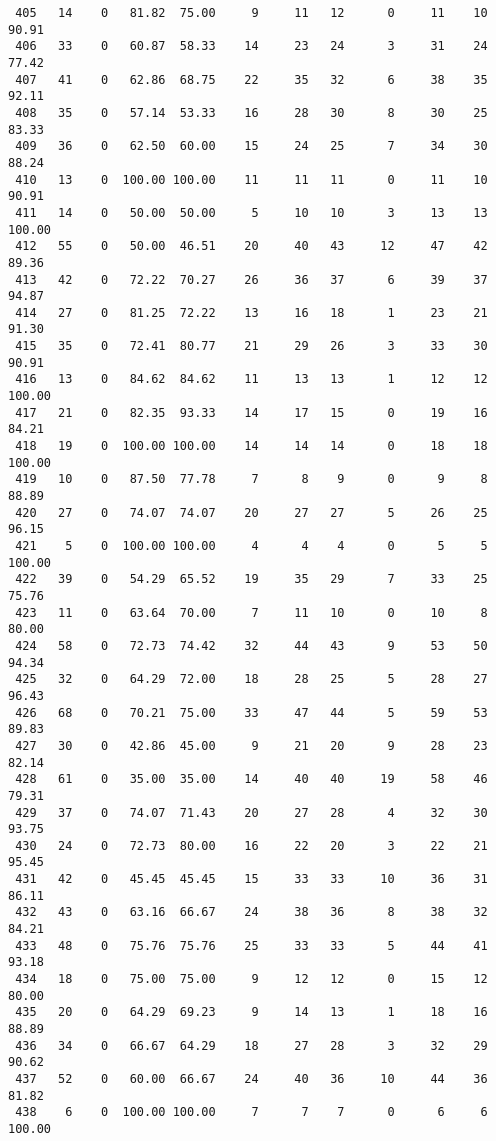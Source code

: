\begin{verbatim}
 405   14    0   81.82  75.00     9     11   12      0     11    10    90.91
 406   33    0   60.87  58.33    14     23   24      3     31    24    77.42
 407   41    0   62.86  68.75    22     35   32      6     38    35    92.11
 408   35    0   57.14  53.33    16     28   30      8     30    25    83.33
 409   36    0   62.50  60.00    15     24   25      7     34    30    88.24
 410   13    0  100.00 100.00    11     11   11      0     11    10    90.91
 411   14    0   50.00  50.00     5     10   10      3     13    13   100.00
 412   55    0   50.00  46.51    20     40   43     12     47    42    89.36
 413   42    0   72.22  70.27    26     36   37      6     39    37    94.87
 414   27    0   81.25  72.22    13     16   18      1     23    21    91.30
 415   35    0   72.41  80.77    21     29   26      3     33    30    90.91
 416   13    0   84.62  84.62    11     13   13      1     12    12   100.00
 417   21    0   82.35  93.33    14     17   15      0     19    16    84.21
 418   19    0  100.00 100.00    14     14   14      0     18    18   100.00
 419   10    0   87.50  77.78     7      8    9      0      9     8    88.89
 420   27    0   74.07  74.07    20     27   27      5     26    25    96.15
 421    5    0  100.00 100.00     4      4    4      0      5     5   100.00
 422   39    0   54.29  65.52    19     35   29      7     33    25    75.76
 423   11    0   63.64  70.00     7     11   10      0     10     8    80.00
 424   58    0   72.73  74.42    32     44   43      9     53    50    94.34
 425   32    0   64.29  72.00    18     28   25      5     28    27    96.43
 426   68    0   70.21  75.00    33     47   44      5     59    53    89.83
 427   30    0   42.86  45.00     9     21   20      9     28    23    82.14
 428   61    0   35.00  35.00    14     40   40     19     58    46    79.31
 429   37    0   74.07  71.43    20     27   28      4     32    30    93.75
 430   24    0   72.73  80.00    16     22   20      3     22    21    95.45
 431   42    0   45.45  45.45    15     33   33     10     36    31    86.11
 432   43    0   63.16  66.67    24     38   36      8     38    32    84.21
 433   48    0   75.76  75.76    25     33   33      5     44    41    93.18
 434   18    0   75.00  75.00     9     12   12      0     15    12    80.00
 435   20    0   64.29  69.23     9     14   13      1     18    16    88.89
 436   34    0   66.67  64.29    18     27   28      3     32    29    90.62
 437   52    0   60.00  66.67    24     40   36     10     44    36    81.82
 438    6    0  100.00 100.00     7      7    7      0      6     6   100.00

\end{verbatim}
